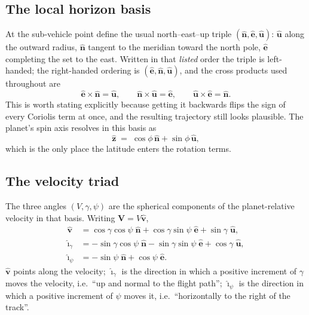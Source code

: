 \documentclass[11pt]{article}
\newcommand{\vhat}{\hat{\mathbf{v}}}
\newcommand{\ig}{\hat{\boldsymbol{\imath}}_{\gamma}}
\newcommand{\ip}{\hat{\boldsymbol{\imath}}_{\psi}}
\newcommand{\nhat}{\hat{\mathbf{n}}}
\newcommand{\ehat}{\hat{\mathbf{e}}}
\newcommand{\uhat}{\hat{\mathbf{u}}}
\newcommand{\zhat}{\hat{\mathbf{z}}}
\begin{document}
\subsection{The local horizon basis}

At the sub-vehicle point define the usual north--east--up triple
$(\nhat,\ehat,\uhat)$: $\uhat$ along the outward radius, $\nhat$ tangent to the
meridian toward the north pole, $\ehat$ completing the set to the east. Written
in that \emph{listed} order the triple is left-handed; the right-handed
ordering is $(\ehat,\nhat,\uhat)$, and the cross products used throughout are
\begin{equation}
  \ehat\times\nhat = \uhat, \qquad
  \nhat\times\uhat = \ehat, \qquad
  \uhat\times\ehat = \nhat .
  \label{eq:handed}
\end{equation}
This is worth stating explicitly because getting it backwards flips the sign of
every Coriolis term at once, and the resulting trajectory still looks
plausible. The planet's spin axis resolves in this basis as
\begin{equation}
  \zhat \;=\; \cos\phi\,\nhat + \sin\phi\,\uhat ,
  \label{eq:zhat}
\end{equation}
which is the only place the latitude enters the rotation terms.

\subsection{The velocity triad}

The three angles $(V,\gamma,\psi)$ are the spherical components of the
planet-relative velocity in that basis. Writing $\mathbf{V} = V\vhat$,
\begin{align}
  \vhat &= \cos\gamma\cos\psi\;\nhat + \cos\gamma\sin\psi\;\ehat
           + \sin\gamma\;\uhat ,   \label{eq:vhat}\\
  \ig   &= -\sin\gamma\cos\psi\;\nhat - \sin\gamma\sin\psi\;\ehat
           + \cos\gamma\;\uhat ,   \label{eq:igam}\\
  \ip   &= -\sin\psi\;\nhat + \cos\psi\;\ehat .  \label{eq:ipsi}
\end{align}
$\vhat$ points along the velocity; $\ig$ is the direction in which a positive
increment of $\gamma$ moves the velocity, i.e.\ ``up and normal to the flight
path''; $\ip$ is the direction in which a positive increment of $\psi$ moves
it, i.e.\ ``horizontally to the right of the track''.
\end{document}
